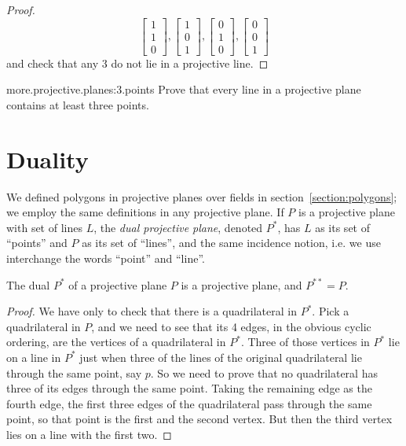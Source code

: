 \begin{proof}
\[
\begin{bmatrix}
1 \\
1 \\
0
\end{bmatrix}, 
\begin{bmatrix}
1 \\
0 \\
1
\end{bmatrix}, 
\begin{bmatrix}
0 \\
1 \\
0
\end{bmatrix}, 
\begin{bmatrix}
0 \\
0 \\
1
\end{bmatrix}
\]
and check that any 3 do not lie in a projective line.
\end{proof}


\begin{problem}{more.projective.planes:3.points}
Prove that every line in a projective plane contains at least three points.
\end{problem}



\section{Duality}

We defined polygons in projective planes over fields in section~\vref{section:polygons}; we employ the same definitions in any projective plane.
If \(P\) is a projective plane with set of lines \(L\), the \emph{dual projective plane}, denoted \(P^*\), has \(L\) as its set of ``points'' and \(P\) as its set of ``lines'', and the same incidence notion, i.e. we use interchange the words ``point'' and ``line''.

\begin{lemma}
The dual \(P^*\) of a projective plane \(P\) is a projective plane, and \(P^{**}=P\).
\end{lemma}
\begin{proof}
We have only to check that there is a quadrilateral in \(P^*\).
Pick a quadrilateral in \(P\), and we need to see that its 4 edges, in the obvious cyclic ordering, are the vertices of a quadrilateral in \(P^*\).
Three of those vertices in \(P^*\) lie on a line in \(P^*\) just when three of the lines of the original quadrilateral lie through the same point, say \(p\).
So we need to prove that no quadrilateral has three of its edges 
through the same point.
Taking the remaining edge as the fourth edge, the first three edges of the quadrilateral pass through the same point, so that point is the first and the second vertex.
But then the third vertex lies on a line with the first two.
\end{proof}


